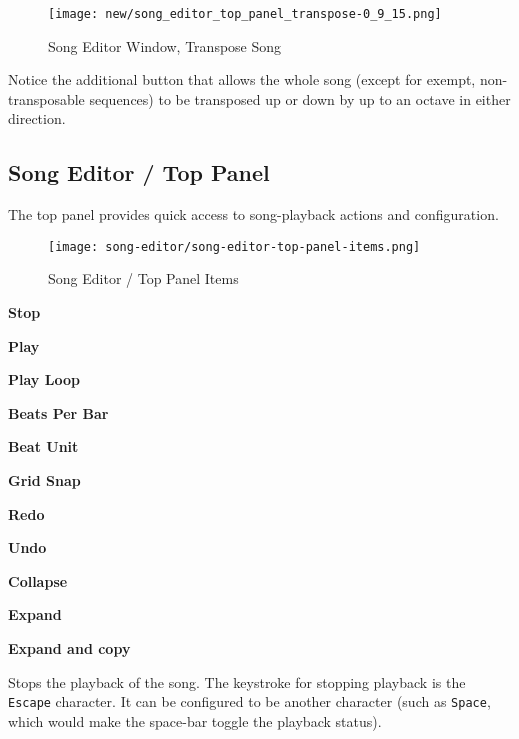 \begin{figure}[H]
   \centering 
   \texttt{[image: new/song\_editor\_top\_panel\_transpose-0\_9\_15.png]}
   \caption{Song Editor Window, Transpose Song}
   \label{fig:song_editor_window_transpose_song}
\end{figure}

   Notice the additional button that allows the whole song (except for
   exempt, non-transposable sequences) to be transposed up or down by up to an
   octave in either direction.

\subsection{Song Editor / Top Panel}
\label{subsec:seq64_song_editor_top}

   The top panel provides quick access to song-playback actions and
   configuration.

\begin{figure}[H]
   \centering 
   \texttt{[image: song-editor/song-editor-top-panel-items.png]}
   \caption{Song Editor / Top Panel Items}
   \label{fig:song_editor_top_panel_items}
\end{figure}

   \begin{enumber}
      \item \textbf{Stop}
      \item \textbf{Play}
      \item \textbf{Play Loop}
      \item \textbf{Beats Per Bar}
      \item \textbf{Beat Unit}
      \item \textbf{Grid Snap}
      \item \textbf{Redo}
      \item \textbf{Undo}
      \item \textbf{Collapse}
      \item \textbf{Expand}
      \item \textbf{Expand and copy}
   \end{enumber}

   \setcounter{ItemCounter}{0}      %

   Stops the playback of the song.
   The keystroke for stopping playback is the \texttt{Escape} character.
   It can be configured to be another character (such as \texttt{Space}, which
   would make the space-bar toggle the playback status).

